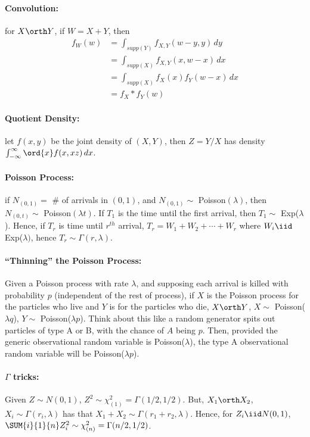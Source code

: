\documentclass[10pt]{article}
\begin{document}
\begin{multicols}{2}
\paragraph{Convolution:} for $X \orth Y$, if $W = X+Y$, then
\begin{align*}
f_{W}(w) &= \int_{supp(Y)}f_{X,Y}(w-y,y) \, dy \\
 &= \int_{supp(X)}f_{X,Y}(x,w-x) \, dx \\
&= \int_{supp(X)}f_{X}(x)f_{Y}(w-x) \, dx \\
&= f_{X}*f_{Y}(w)
\end{align*}

\paragraph{Quotient Density:} let $f(x,y)$ be the joint density of $(X,Y)$, then $Z=Y/X$ has density $\int_{-\infty}^{\infty} \ord{x} f(x,xz) \, dx$. 

\paragraph{Poisson Process:} if $N_{(0,1)} =$ \# of arrivals in $(0,1)$, and $N_{(0,1)} \sim$ Poisson$(\lambda)$, then $N_{(0,t)} \sim$ Poisson$(\lambda t)$. If $T_1$ is the time until the first arrival, then $T_1 \sim$ Exp($\lambda$). Hence, if $T_{r}$ is time until $r^{th}$ arrival, $T_r = W_1 + W_2 + \cdots + W_r$ where $W_i \iid$ Exp($\lambda)$, hence $T_{r} \sim \Gamma(r,\lambda)$.   

\paragraph{``Thinning'' the Poisson Process:} Given a Poisson process with rate $\lambda$, and supposing each arrival is killed with probability $p$ (independent of the rest of process), if $X$ is the Poisson process for the particles who live and $Y$ is for the particles who die, $X \orth Y$, $X \sim$ Poisson($\lambda q$), $Y \sim$ Poisson($\lambda p$). Think about this like a random generator spits out particles of type A or B, with the chance of $A$ being $p$. Then, provided the generic observational random variable is Poisson($\lambda$), the type A observational random variable will be Poisson($\lambda p$). 
 
\paragraph{$\Gamma$ tricks:} Given $Z \sim N(0,1)$, $Z^2 \sim \chi^{2}_{(1)} = \Gamma(1/2,1/2)$. But, $X_1 \orth X_2$, $X_i \sim \Gamma(r_i, \lambda)$ has that $X_1 + X_2 \sim \Gamma(r_1 + r_2, \lambda)$. Hence, for $Z_i \iid N(0,1)$, $\SUM{i}{1}{n} Z_i^2 \sim \chi_{(n)}^{2} = \Gamma(n/2, 1/2)$. 


\end{multicols}
\end{document}
